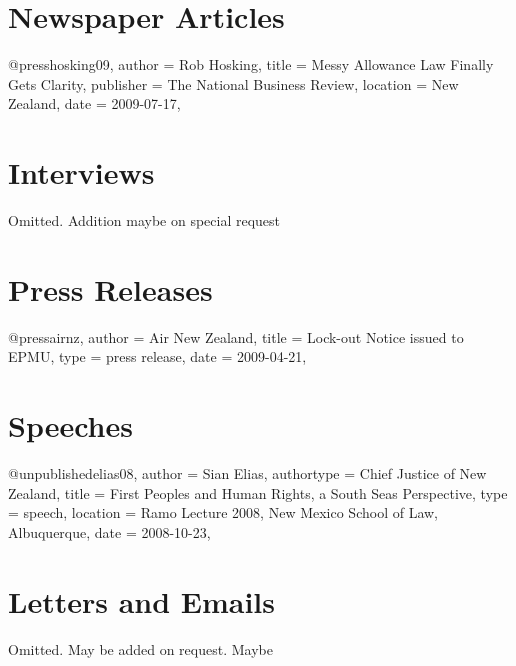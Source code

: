 \documentclass{book}
\begin{document}
\section{Newspaper Articles}
\begin{bib}
@press{hosking09,
author = {Rob Hosking},
title = {Messy Allowance Law Finally Gets Clarity},
publisher = {The National Business Review},
location = {New Zealand},
date = {2009-07-17},
}
\end{bib}

\section{Interviews}

Omitted. Addition maybe on special request

\section{Press Releases}
\begin{bib}
@press{airnz,
author = {Air New Zealand},
title = {Lock-out Notice issued to EPMU},
type = {press release},
date = {2009-04-21},
}
\end{bib}

\section{Speeches}
\begin{bib}
@unpublished{elias08,
author = {Sian Elias},
authortype = {Chief Justice of New Zealand},
title = {First Peoples and Human Rights, a South Seas Perspective},
type = {speech},
location = {Ramo Lecture 2008, New Mexico School of Law, Albuquerque},
date = {2008-10-23},
}
\end{bib}

\section{Letters and Emails}
Omitted. May be added on request. Maybe
\end{document}
